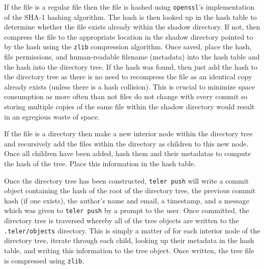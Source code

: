 \documentclass[12pt, letterpaper]{article}
\begin{document}
\begin{multicols}{2}
  If the file is a regular file then the file is hashed using
  \texttt{openssl}'s implementation of the SHA-1 hashing algorithm.
  The hash is then looked up in the hash table to determine whether
  the file exists already within the shadow directory. If not, then
  compress the file to the appropriate location in the shadow
  directory pointed to by the hash using the \texttt{zlib}
  compression algorithm. Once saved, place the hash, file
  permissions, and human-readable filename (metadata) into the hash
  table and the hash into the directory tree. If the hash was found,
  then just add the hash to the directory tree as there is no need
  to recompress the file as an identical copy already exists (unless
  there is a hash collision). This is crucial to minimize space
  consumption as more often than not files do not change with every
  commit so storing multiple copies of the same file within the
  shadow directory would result in an egregious waste of space.

  If the file is a directory then make a new interior node
  within the directory tree and recursively add the files within the
  directory as children to this new node. Once all children have
  been added, hash them and their metadatas to compute the hash of
  the tree. Place this information in the hash table.

  Once the directory tree has been constructed, \texttt{teler push}
  will write a commit object containing the hash of the root of the
  directory tree, the previous commit hash (if one exists), the
  author's name and email, a timestamp, and a message which was given
  to \texttt{teler push} by a prompt to the user. Once committed, the
  directory tree is traversed whereby all of the tree objects are
  written to the \texttt{.teler/objects} directory. This is simply a
  matter of for each interior node of the directory tree, iterate
  through each child, looking up their metadata in the hash table, and
  writing this information to the tree object. Once written, the tree
  file is compressed using \texttt{zlib}.

  \begin{center}
    \begin{minipage}{.2\textwidth}
\end{minipage}
\end{center}
\end{multicols}
\end{document}
